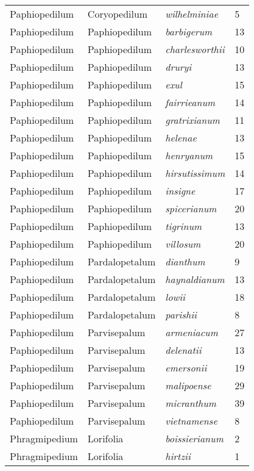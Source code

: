 \documentclass[review,3p,twocolumn]{elsarticle}
\begin{document}
\begin{footnotesize}
\begin{longtable}{llll}
    Paphiopedilum & Coryopedilum & \textit{wilhelminiae} & 5 \\
    Paphiopedilum & Paphiopedilum & \textit{barbigerum} & 13 \\
    Paphiopedilum & Paphiopedilum & \textit{charlesworthii} & 10 \\
    Paphiopedilum & Paphiopedilum & \textit{druryi} & 13 \\
    Paphiopedilum & Paphiopedilum & \textit{exul} & 15 \\
    Paphiopedilum & Paphiopedilum & \textit{fairrieanum} & 14 \\
    Paphiopedilum & Paphiopedilum & \textit{gratrixianum} & 11 \\
    Paphiopedilum & Paphiopedilum & \textit{helenae} & 13 \\
    Paphiopedilum & Paphiopedilum & \textit{henryanum} & 15 \\
    Paphiopedilum & Paphiopedilum & \textit{hirsutissimum} & 14 \\
    Paphiopedilum & Paphiopedilum & \textit{insigne} & 17 \\
    Paphiopedilum & Paphiopedilum & \textit{spicerianum} & 20 \\
    Paphiopedilum & Paphiopedilum & \textit{tigrinum} & 13 \\
    Paphiopedilum & Paphiopedilum & \textit{villosum} & 20 \\
    Paphiopedilum & Pardalopetalum & \textit{dianthum} & 9 \\
    Paphiopedilum & Pardalopetalum & \textit{haynaldianum} & 13 \\
    Paphiopedilum & Pardalopetalum & \textit{lowii} & 18 \\
    Paphiopedilum & Pardalopetalum & \textit{parishii} & 8 \\
    Paphiopedilum & Parvisepalum & \textit{armeniacum} & 27 \\
    Paphiopedilum & Parvisepalum & \textit{delenatii} & 13 \\
    Paphiopedilum & Parvisepalum & \textit{emersonii} & 19 \\
    Paphiopedilum & Parvisepalum & \textit{malipoense} & 29 \\
    Paphiopedilum & Parvisepalum & \textit{micranthum} & 39 \\
    Paphiopedilum & Parvisepalum & \textit{vietnamense} & 8 \\
    Phragmipedium & Lorifolia & \textit{boissierianum} & 2 \\
    Phragmipedium & Lorifolia & \textit{hirtzii} & 1 \\

\end{longtable}
\end{footnotesize}
\end{document}
